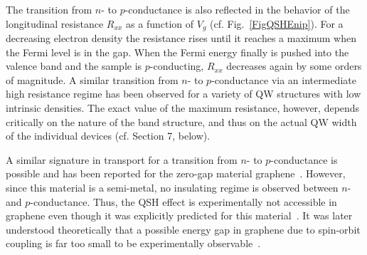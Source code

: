 \documentclass{article}
\begin{document}
The transition from $n$- to $p$-conductance is also reflected in the
behavior of the longitudinal resistance $R_{xx}$ as a function of
$V_g$ (cf. Fig.~\ref{FigQSHEnip}). For a decreasing electron density
the resistance rises until it reaches a maximum when the Fermi level
is in the gap. When the Fermi energy finally is pushed into the
valence band and the sample is $p$-conducting,
$R_{xx}$ decreases again by some orders of magnitude. A similar
transition from $n$- to $p$-conductance via an intermediate
high resistance regime has been observed for a variety of QW structures
with low intrinsic densities. The exact value of the maximum resistance, however,
depends critically on the nature of the band structure, and thus on
the actual QW width of the individual devices (cf. Section 7, below).

A similar signature in transport for a transition from $n$- to
$p$-conductance is possible and has been reported for the zero-gap
material graphene~\cite{Geim07}. However, since this material is a
semi-metal, no insulating regime is observed between $n$- and
$p$-conductance. Thus, the QSH effect is experimentally not
accessible in graphene even though it was explicitly predicted for
this material~\cite{kane2005A}. It was later understood
theoretically that a possible energy gap in graphene due to spin-orbit coupling
is far too small to be experimentally observable~\cite{yao2007,min2006}.
\end{document}
